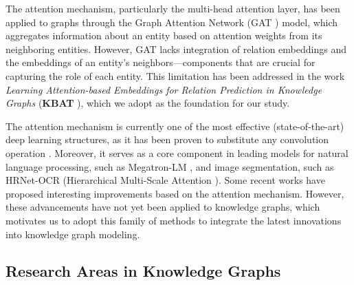 The attention mechanism, particularly the multi-head attention layer, has been applied to graphs through the Graph Attention Network (GAT \cite{velivckovic2017graph}) model, which aggregates information about an entity based on attention weights from its neighboring entities. However, GAT lacks integration of relation embeddings and the embeddings of an entity's neighbors—components that are crucial for capturing the role of each entity. This limitation has been addressed in the work \textit{Learning Attention-based Embeddings for Relation Prediction in Knowledge Graphs} (\textbf{KBAT} \cite{nathani2019learning}), which we adopt as the foundation for our study.


The attention mechanism is currently one of the most effective (state-of-the-art) deep learning structures, as it has been proven to substitute any convolution operation \cite{cordonnier2019relationship}. Moreover, it serves as a core component in leading models for natural language processing, such as Megatron-LM \cite{shoeybi2019megatron}, and image segmentation, such as HRNet-OCR (Hierarchical Multi-Scale Attention \cite{tao2020hierarchical}). Some recent works \cite{cordonnier2020multi} have proposed interesting improvements based on the attention mechanism. However, these advancements have not yet been applied to knowledge graphs, which motivates us to adopt this family of methods to integrate the latest innovations into knowledge graph modeling.

\subsection{Research Areas in Knowledge Graphs}

